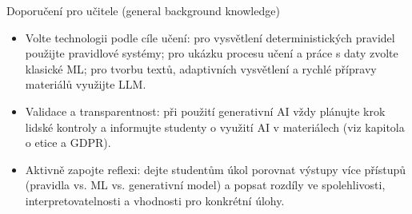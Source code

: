 Doporučení pro učitele (general background knowledge)
\begin{itemize}
  \item Volte technologii podle cíle učení: pro vysvětlení deterministických pravidel použijte pravidlové systémy; pro ukázku procesu učení a práce s daty zvolte klasické ML; pro tvorbu textů, adaptivních vysvětlení a rychlé přípravy materiálů využijte LLM.
  \item Validace a transparentnost: při použití generativní AI vždy plánujte krok lidské kontroly a informujte studenty o využití AI v materiálech (viz kapitola o etice a GDPR).
  \item Aktivně zapojte reflexi: dejte studentům úkol porovnat výstupy více přístupů (pravidla vs. ML vs. generativní model) a popsat rozdíly ve spolehlivosti, interpretovatelnosti a vhodnosti pro konkrétní úlohy.
\end{itemize}